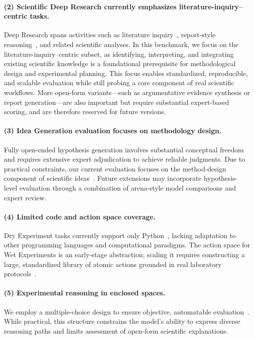 \paragraph{(2) Scientific Deep Research currently emphasizes literature-inquiry–centric tasks.}
Deep Research spans activities such as literature inquiry~\cite{Bosse2025DeepRB}, report-style reasoning~\cite{du2025deepresearchbenchcomprehensivebenchmark}, and related scientific analyses. In this benchmark, we focus on the literature-inquiry–centric subset, as identifying, interpreting, and integrating existing scientific knowledge is a foundational prerequisite for methodological design and experimental planning. This focus enables standardized, reproducible, and scalable evaluation while still probing a core component of real scientific workflows. More open-form variants—such as argumentative evidence synthesis or report generation—are also important but require substantial expert-based scoring, and are therefore reserved for future versions.

\paragraph{(3) Idea Generation evaluation focuses on methodology design.}
Fully open-ended hypothesis generation involves substantial conceptual freedom and requires extensive expert adjudication to achieve reliable judgments. Due to practical constraints, our current evaluation focuses on the method-design component of scientific ideas~\cite{Wan2025DeepResearchAT, popper2005logic, yang2024moose}. Future extensions may incorporate hypothesis-level evaluation through a combination of arena-style model comparisons and expert review.

\paragraph{(4) Limited code and action space coverage.}
Dry Experiment tasks currently support only Python~\cite{tian2024scicoderesearchcodingbenchmark}, lacking adaptation to other programming languages and computational paradigms. The action space for Wet Experiments is an early-stage abstraction; scaling it requires constructing a large, standardized library of atomic actions grounded in real laboratory protocols~\cite{Liu2025BioProBenchCD}.

\paragraph{(5) Experimental reasoning in enclosed spaces.}
We employ a multiple-choice design to ensure objective, automatable evaluation~\cite{zhou2025scientistsexamprobingcognitive}. While practical, this structure constrains the model’s ability to express diverse reasoning paths and limits assessment of open-form scientific explanations.

